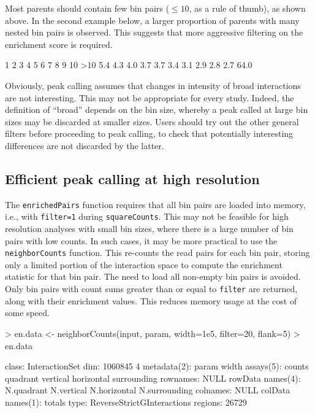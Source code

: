 \documentclass[12pt]{report}
\renewenvironment{Schunk}{\vspace{0pt}}{\vspace{0pt}}
\newcommand{\code}[1]{{\small\texttt{#1}}}
\begin{document}
Most parents should contain few bin pairs ($\le 10$, as a rule of thumb), as shown above.
In the second example below, a larger proportion of parents with many nested bin pairs is observed.
This suggests that more aggressive filtering on the enrichment score is required.

\begin{Schunk}
\begin{Soutput}
   1    2    3    4    5    6    7    8    9   10  >10 
 5.4  4.3  4.0  3.7  3.7  3.4  3.1  2.9  2.8  2.7 64.0 
\end{Soutput}
\end{Schunk}

Obviously, peak calling assumes that changes in intensity of broad interactions are not interesting.
This may not be appropriate for every study.
Indeed, the definition of ``broad'' depends on the bin size, whereby a peak called at large bin sizes may be discarded at smaller sizes.
Users should try out the other general filters before proceeding to peak calling, to check that potentially interesting differences are not discarded by the latter.

\subsection{Efficient peak calling at high resolution}
The \code{enrichedPairs} function requires that all bin pairs are loaded into memory, i.e., with \code{filter=1} during \code{squareCounts}.
This may not be feasible for high resolution analyses with small bin sizes, where there is a large number of bin pairs with low counts.
In such cases, it may be more practical to use the \code{neighborCounts} function.
This re-counts the read pairs for each bin pair, storing only a limited portion of the interaction space to compute the enrichment statistic for that bin pair.
The need to load all non-empty bin pairs is avoided.
Only bin pairs with count sums greater than or equal to \code{filter} are returned, along with their enrichment values.
This reduces memory usage at the cost of some speed.

\begin{Schunk}
\begin{Sinput}
> en.data <- neighborCounts(input, param, width=1e5, filter=20, flank=5)
> en.data
\end{Sinput}
\begin{Soutput}
class: InteractionSet 
dim: 1060845 4 
metadata(2): param width
assays(5): counts quadrant vertical horizontal surrounding
rownames: NULL
rowData names(4): N.quadrant N.vertical N.horizontal N.surrounding
colnames: NULL
colData names(1): totals
type: ReverseStrictGInteractions
regions: 26729
\end{Soutput}
\end{Schunk}
\end{document}
